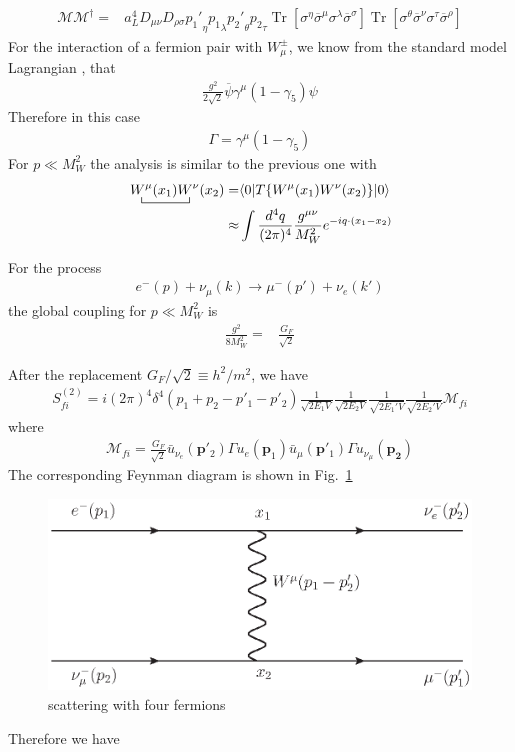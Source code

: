 \begin{align}
 \mathcal{M}\mathcal{M}^{\dagger}  =&a_L^4D_{\mu\nu} D_{\rho\sigma} {p_1'}_{\eta}{p_1}_{\lambda}{p_2'}_{\theta}{p_2}_{\tau}\operatorname{Tr}\left[\sigma^{\eta} \overline{\sigma}^{\mu}  \sigma^{\lambda} \overline{\sigma}^{\sigma}\right] 
               \operatorname{Tr}\left[\sigma^{\theta} \overline{\sigma}^{\nu} \sigma^{\tau} \overline{\sigma}^{\rho}\right] 
\end{align}
For the interaction of a fermion pair with $W_\mu^\pm$, we know from
the standard model Lagrangian \cite{lsm}, that
\begin{align}
  \frac{g^2}{2\sqrt{2}}\overline{\psi}\gamma^\mu(1-\gamma_5)\psi
\end{align}
Therefore in this case
\begin{align}
  \Gamma=\gamma^\mu(1-\gamma_5)
\end{align}
For $p\ll M_W^2$ the analysis is similar to the previous one with
\begin{align}
   \bcontraction{\,}{W^\mu}{(x_1)}{W^\nu}
\,W^\mu(x_1)W^\nu(x_2)=&\langle0|T\{W^\mu(x_1)W^\nu(x_2)\}|0\rangle\nonumber\\
\approx&\int\frac{d^4q}{(2\pi)^4}\frac{g^{\mu\nu}}{M_W^2}e^{-i q\cdot(x_1-x_2)}
\end{align}

For the process 
\begin{align}
  e^-(p)+\nu_\mu(k)\to\mu^-(p')+\nu_e(k')
\end{align}
the global coupling for $p\ll M_W^2$ is
\begin{align}
  \frac{g^2}{8M_W^2}=&\frac{G_F}{\sqrt{2}}
\end{align}

After the replacement $G_F/\sqrt{2}\equiv h^2/m^2$, we have
\begin{align}
  \label{eq:101f}
  S^{(2)}_{fi}=i(2\pi)^4\delta^{4}\left(p_1+p_2-p'_1-p'_2\right)
  \frac{1}{\sqrt{2E_1 V}}\frac{1}{\sqrt{2E_2 V}}
  \frac{1}{\sqrt{2E_1' V}}\frac{1}{\sqrt{2E_2' V}}
  \mathcal{M}_{fi}
\end{align}
where
\begin{align}
  \mathcal{M}_{fi}=\frac{G_F}{\sqrt{2}}
\bar{u}_{\nu_e}(\mathbf{p}'_2)\Gamma u_e(\mathbf{p}_1)\bar{u}_\mu(\mathbf{p}'_1)\Gamma u_{\nu_\mu}(\mathbf{p_2})
\end{align}
The corresponding Feynman diagram is shown in Fig.~\ref{fig:sw}
\begin{figure} %
  \centering %
  \includegraphics{scatteringw} %
  \caption{scattering with four fermions} %
  \label{fig:sw} %
\end{figure} %
Therefore we have

